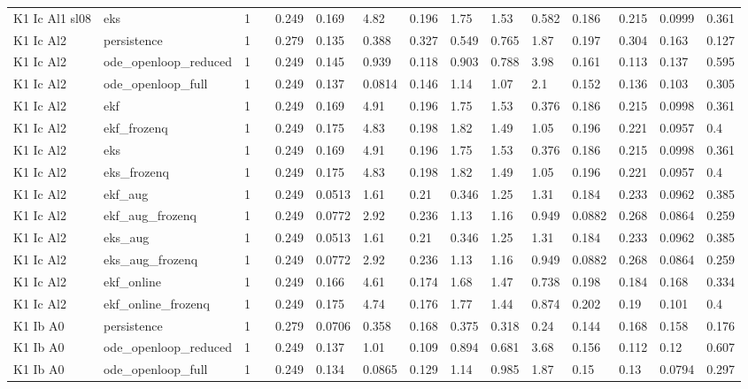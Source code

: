 \begin{table}[t]
\begin{tabular}{lllllllllllllll}
K1 Ic Al1 sl08 & eks & 1 &  & 0.249 & 0.169 & 4.82 & 0.196 & 1.75 & 1.53 & 0.582 & 0.186 & 0.215 & 0.0999 & 0.361 \\
K1 Ic Al2 & persistence & 1 &  & 0.279 & 0.135 & 0.388 & 0.327 & 0.549 & 0.765 & 1.87 & 0.197 & 0.304 & 0.163 & 0.127 \\
K1 Ic Al2 & ode\_openloop\_reduced & 1 &  & 0.249 & 0.145 & 0.939 & 0.118 & 0.903 & 0.788 & 3.98 & 0.161 & 0.113 & 0.137 & 0.595 \\
K1 Ic Al2 & ode\_openloop\_full & 1 &  & 0.249 & 0.137 & 0.0814 & 0.146 & 1.14 & 1.07 & 2.1 & 0.152 & 0.136 & 0.103 & 0.305 \\
K1 Ic Al2 & ekf & 1 &  & 0.249 & 0.169 & 4.91 & 0.196 & 1.75 & 1.53 & 0.376 & 0.186 & 0.215 & 0.0998 & 0.361 \\
K1 Ic Al2 & ekf\_frozenq & 1 &  & 0.249 & 0.175 & 4.83 & 0.198 & 1.82 & 1.49 & 1.05 & 0.196 & 0.221 & 0.0957 & 0.4 \\
K1 Ic Al2 & eks & 1 &  & 0.249 & 0.169 & 4.91 & 0.196 & 1.75 & 1.53 & 0.376 & 0.186 & 0.215 & 0.0998 & 0.361 \\
K1 Ic Al2 & eks\_frozenq & 1 &  & 0.249 & 0.175 & 4.83 & 0.198 & 1.82 & 1.49 & 1.05 & 0.196 & 0.221 & 0.0957 & 0.4 \\
K1 Ic Al2 & ekf\_aug & 1 &  & 0.249 & 0.0513 & 1.61 & 0.21 & 0.346 & 1.25 & 1.31 & 0.184 & 0.233 & 0.0962 & 0.385 \\
K1 Ic Al2 & ekf\_aug\_frozenq & 1 &  & 0.249 & 0.0772 & 2.92 & 0.236 & 1.13 & 1.16 & 0.949 & 0.0882 & 0.268 & 0.0864 & 0.259 \\
K1 Ic Al2 & eks\_aug & 1 &  & 0.249 & 0.0513 & 1.61 & 0.21 & 0.346 & 1.25 & 1.31 & 0.184 & 0.233 & 0.0962 & 0.385 \\
K1 Ic Al2 & eks\_aug\_frozenq & 1 &  & 0.249 & 0.0772 & 2.92 & 0.236 & 1.13 & 1.16 & 0.949 & 0.0882 & 0.268 & 0.0864 & 0.259 \\
K1 Ic Al2 & ekf\_online & 1 &  & 0.249 & 0.166 & 4.61 & 0.174 & 1.68 & 1.47 & 0.738 & 0.198 & 0.184 & 0.168 & 0.334 \\
K1 Ic Al2 & ekf\_online\_frozenq & 1 &  & 0.249 & 0.175 & 4.74 & 0.176 & 1.77 & 1.44 & 0.874 & 0.202 & 0.19 & 0.101 & 0.4 \\
K1 Ib A0 & persistence & 1 &  & 0.279 & 0.0706 & 0.358 & 0.168 & 0.375 & 0.318 & 0.24 & 0.144 & 0.168 & 0.158 & 0.176 \\
K1 Ib A0 & ode\_openloop\_reduced & 1 &  & 0.249 & 0.137 & 1.01 & 0.109 & 0.894 & 0.681 & 3.68 & 0.156 & 0.112 & 0.12 & 0.607 \\
K1 Ib A0 & ode\_openloop\_full & 1 &  & 0.249 & 0.134 & 0.0865 & 0.129 & 1.14 & 0.985 & 1.87 & 0.15 & 0.13 & 0.0794 & 0.297 \\

\end{tabular}
\end{table}
